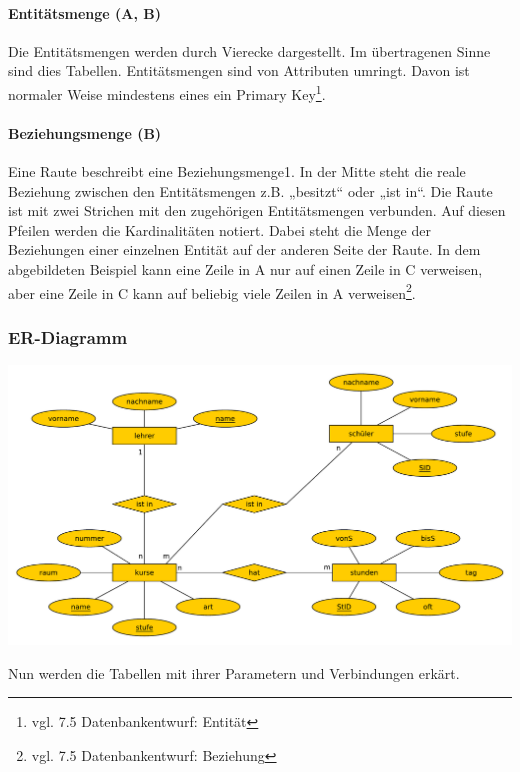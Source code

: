 \documentclass[a4paper, 12pt]{article}
\theoremstyle{plain}
\theoremstyle{definition}
\begin{document}
	\paragraph{Entitätsmenge (A, B)} Die Entitätsmengen werden durch Vierecke dargestellt. Im übertragenen Sinne sind dies Tabellen. Entitätsmengen sind von Attributen umringt. Davon ist normaler Weise mindestens eines ein Primary Key\footnote{vgl. \cite{Jarosch2010} 7.5 Datenbankentwurf: Entität}.
	
	\paragraph{Beziehungsmenge (B)} Eine Raute beschreibt eine Beziehungsmenge1. In der Mitte steht die reale Beziehung zwischen den Entitätsmengen z.B. „besitzt“ oder „ist in“. Die Raute ist mit zwei Strichen mit den zugehörigen Entitätsmengen verbunden.  Auf diesen Pfeilen werden die Kardinalitäten notiert. Dabei steht die Menge der Beziehungen einer einzelnen Entität auf der anderen Seite der Raute. In dem abgebildeten Beispiel kann eine Zeile in A nur auf einen Zeile in C verweisen, aber eine Zeile in C kann auf beliebig viele Zeilen in A verweisen\footnote{vgl. \cite{Jarosch2010} 7.5 Datenbankentwurf: Beziehung}. 
	\subsubsection{ER-Diagramm}
	\label{sec:ERDia}
	\begin{center}
	\includegraphics[scale=0.4]{ERStund.pdf}
	\end{center}

Nun werden die Tabellen mit ihrer Parametern und Verbindungen erkärt. 
\end{document}
